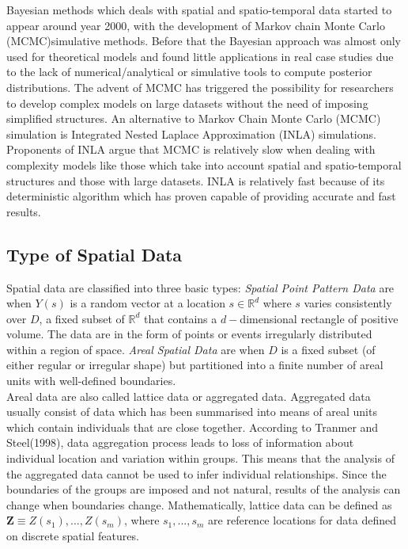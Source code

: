 \documentclass[a4paper]{thesis}
\begin{document}
Bayesian methods which deals with spatial and spatio-temporal data started to appear around year 2000, with the development of Markov chain Monte Carlo (MCMC)simulative methods. Before that the Bayesian approach was almost only used for theoretical models and found little
applications in real case studies due to the lack of numerical/analytical or simulative tools to compute posterior distributions. The advent of MCMC has triggered the possibility for researchers to develop complex models on large datasets without the need of imposing simplified structures. An alternative to Markov Chain Monte Carlo (MCMC) simulation is Integrated Nested Laplace Approximation (INLA) simulations. Proponents of INLA argue that MCMC is relatively slow when dealing with complexity models like those which take into account spatial and spatio-temporal structures and those with large datasets. INLA is relatively fast because of its deterministic algorithm which has proven capable of providing accurate and fast results.

\subsection{Type of Spatial Data}

Spatial data are classified into three basic types: \textit{Spatial Point Pattern Data} are when $Y(s)$ is a random vector at a location $s \in \mathbb{R}^d$ where $s$ varies consistently over $D$, a fixed subset of $\mathbb{R}^d$ that contains a $d-$dimensional rectangle of positive volume. The data are in the form of points or events irregularly distributed within a region of space. \textit{Areal Spatial Data} are when $D$ is a fixed subset (of either regular or irregular shape) but partitioned into a finite number of areal units with well-defined boundaries.\\

Areal data are also called lattice data or aggregated data. Aggregated data usually consist of data which has been summarised into means of areal units which contain individuals that are close together. According to Tranmer and Steel(1998), data aggregation process leads to loss of information about individual location and variation within groups. This means that the analysis of the aggregated data cannot be used to infer individual relationships. Since the boundaries of the groups are imposed and not natural, results of the analysis can change when boundaries change. Mathematically, lattice data can be defined as $\textbf{Z} \equiv {Z(s_1),...,Z(s_m)}$, where ${s_1,...,s_m}$ are reference locations for data defined on discrete spatial features.\cite{CressieWikle2011}
\end{document}
